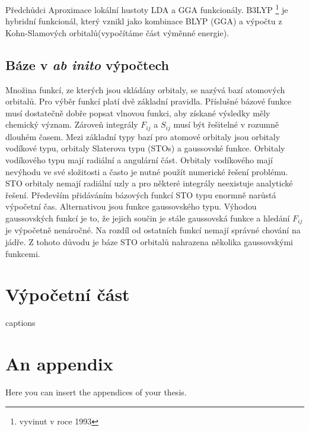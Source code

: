 \documentclass[
  digital, %
  table,   %
  lof,     %
  lot,     %
]{fithesis3}
\begin{document}
Předchůdci Aproximace lokální hustoty LDA a GGA funkcionály. B3LYP \footnote{vyvinut v roce 1993} je hybridní funkcionál, který vznikl jako kombinace BLYP (GGA) a výpočtu z Kohn-Slamových orbitalů(vypočítáme část výměnné energie).


\section{Báze v \textit{ab inito} výpočtech }\label{kapitola_baze}
Množina funkcí, ze kterých jsou skládány orbitaly, se nazývá bazí atomových orbitalů. Pro výběr funkcí platí dvě základní pravidla. Příslušné bázové funkce musí dostatečně dobře popsat vlnovou funkci, aby získané výsledky měly chemický význam. Zároveň integrály $F_{ij}$ a $S_{ij}$ musí být řešitelné v rozumně dlouhém časem. \cite{lowe2011quantum}
Mezi základní typy bazí pro atomové orbitaly jsou orbitaly vodíkové typu, orbitaly Slaterova typu (STOs) a gaussovské funkce. \cite{dftshrnutivysledky}
Orbitaly vodíkového typu mají radiální a angulární část. Orbitaly vodíkového mají nevýhodu ve své složitosti a často je nutné použít numerické řešení problému. STO orbitaly nemají radiální uzly a pro některé integrály neexistuje analytické řešení. Především přidáváním bázových funkcí STO typu enormně narůstá výpočetní čas. Alternativou jsou funkce gaussovského typu. Výhodou gaussovských funkcí je to, že jejich součin je stále gaussovská funkce a hledání $F_{ij}$je výpočetně nenáročné. Na rozdíl od ostatních funkcí nemají správné chování na jádře. Z tohoto důvodu je báze STO orbitalů nahrazena několika gaussovskými funkcemi.\cite{lowe2011quantum} \\



\chapter{Výpočetní část}

{\csname captions\languagename\endcsname %
\makeatletter %
  \thesis@selectLocale{\thesis@locale}\makeatother
\printbibliography[heading=bibintoc]} %
\appendix %
\chapter{An appendix}
Here you can insert the appendices of your thesis.   
\end{document}
